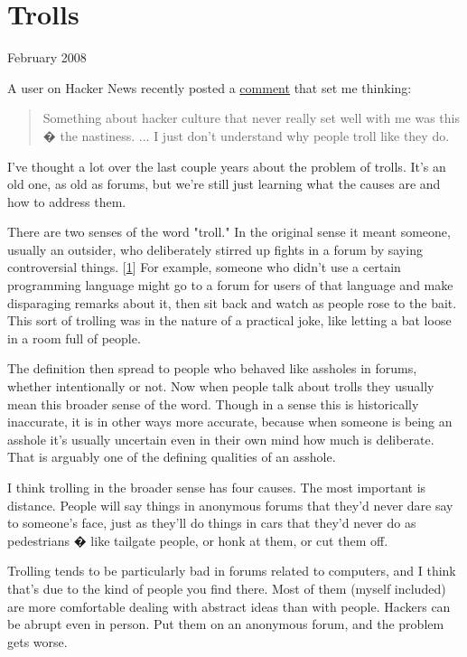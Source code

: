 \chapter{Trolls}



February 2008

A user on Hacker News recently posted a
\href{http://news.ycombinator.com/item?id=116938}{comment}
that set me thinking:
\begin{quote}

  Something about hacker culture that never really set well with
  me was this � the nastiness. ... I just don't understand why people
  troll like they do.

\end{quote}

I've thought a lot over the last couple years about the problem of
trolls.  It's an old one, as old as forums, but
we're still just learning what the causes are and how to address
them.

There are two senses of the word "troll."  In the original sense
it meant someone, usually an outsider, who deliberately stirred up
fights in a forum by saying controversial things.
[\href{\#f1n}{1}]
For example,
someone who didn't use a certain programming language might go to
a forum for users of that language and make disparaging remarks
about it, then sit back and watch as people rose to the bait.  This
sort of trolling was in the nature of a practical joke, like letting
a bat loose in a room full of people.

The definition then spread to people who behaved like assholes in
forums, whether intentionally or not.  Now when people talk about
trolls they usually mean this broader sense of the word.  Though
in a sense this is historically inaccurate, it is in other ways
more accurate, because when someone is being an asshole it's usually
uncertain even in their own mind how much is deliberate.
That is arguably one of the defining qualities of an asshole.

I think trolling in the broader sense has four causes.  The most
important is distance.  People will say things in anonymous forums
that they'd never dare say to someone's face, just as they'll do
things in cars that they'd never do as pedestrians � like tailgate
people, or honk at them, or cut them off.

Trolling tends to be particularly bad in forums related to computers,
and I think that's due to the kind of people you find there.  Most
of them (myself included) are more comfortable dealing with abstract
ideas than with people.  Hackers can be abrupt even in person.  Put
them on an anonymous forum, and the problem gets worse.

